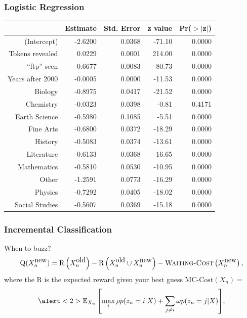 \begin{frame}

\frametitle{Logistic Regression}

\begin{tabular}{rrrrr}
  \hline
 & Estimate & Std. Error & z value & Pr($>$$|$z$|$) \\
  \hline
(Intercept) & -2.6200 & 0.0368 & -71.10 & 0.0000 \\
  Tokens revealed & 0.0229 & 0.0001 & 214.00 & 0.0000 \\
  ``ftp'' seen & 0.6677 & 0.0083 & 80.73 & 0.0000 \\
  Years after 2000 & -0.0005 & 0.0000 & -11.53 & 0.0000 \\
  Biology & -0.8975 & 0.0417 & -21.52 & 0.0000 \\
  Chemistry & -0.0323 & 0.0398 & -0.81 & 0.4171 \\
  Earth Science & -0.5980 & 0.1085 & -5.51 & 0.0000 \\
  Fine Arts & -0.6800 & 0.0372 & -18.29 & 0.0000 \\
  History & -0.5083 & 0.0374 & -13.61 & 0.0000 \\
  Literature & -0.6133 & 0.0368 & -16.65 & 0.0000 \\
  Mathematics & -0.5810 & 0.0530 & -10.95 & 0.0000 \\
  Other & -1.2591 & 0.0773 & -16.29 & 0.0000 \\
  Physics & -0.7292 & 0.0405 & -18.02 & 0.0000 \\
  Social Studies & -0.5607 & 0.0369 & -15.18 & 0.0000 \\
   \hline
\end{tabular}

\end{frame}

\begin{frame}
	\frametitle{Incremental Classification}
	\begin{block}{When to buzz?}
	\begin{equation}
  \mbox{Q}(X_n^{\mbox{new}}) =  \mbox{R}  \left(X_n^{\mbox{old}}\right) -
  \mbox{R}\left(X_n^{\mbox{old}} \cup
  X_n^{\mbox{new}}\right) - \mbox{\textsc{Waiting-Cost}}\left(X_n^{\mbox {new}}\right),
\label{eq:util}
\end{equation}
where the R is the expected reward given your best guess $\mbox{MC-Cost}(X_n) = $
\begin{equation*}
\alert<2>{\e{X_n}{ \max_{i} \rho p(z_n = i | X) + \sum_{j \not = i} \omega p(z_n = j | X)  }},
\end{equation*}
	\end{block}

\end{frame}